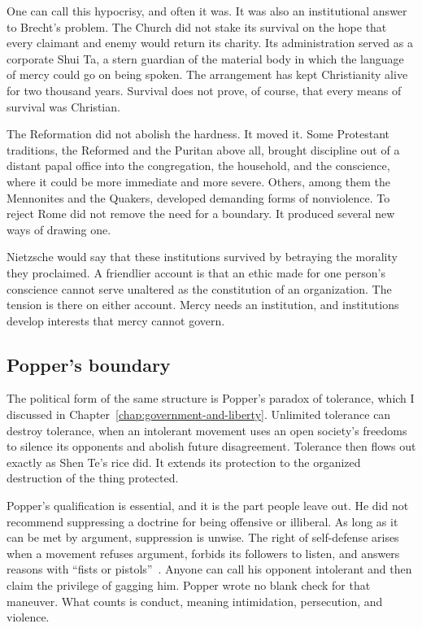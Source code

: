 \documentclass[12pt,a4paper]{book}
\begin{document}
One can call this hypocrisy, and often it was. It was also an institutional answer to Brecht's problem. The Church did not stake its survival on the hope that every claimant and enemy would return its charity. Its administration served as a corporate Shui Ta, a stern guardian of the material body in which the language of mercy could go on being spoken. The arrangement has kept Christianity alive for two thousand years. Survival does not prove, of course, that every means of survival was Christian.

The Reformation did not abolish the hardness. It moved it. Some Protestant traditions, the Reformed and the Puritan above all, brought discipline out of a distant papal office into the congregation, the household, and the conscience, where it could be more immediate and more severe. Others, among them the Mennonites and the Quakers, developed demanding forms of nonviolence. To reject Rome did not remove the need for a boundary. It produced several new ways of drawing one.

Nietzsche would say that these institutions survived by betraying the morality they proclaimed. A friendlier account is that an ethic made for one person's conscience cannot serve unaltered as the constitution of an organization. The tension is there on either account. Mercy needs an institution, and institutions develop interests that mercy cannot govern.

\subsection{Popper's boundary}

The political form of the same structure is Popper's paradox of tolerance, which I discussed in Chapter~\ref{chap:government-and-liberty}. Unlimited tolerance can destroy tolerance, when an intolerant movement uses an open society's freedoms to silence its opponents and abolish future disagreement. Tolerance then flows out exactly as Shen Te's rice did. It extends its protection to the organized destruction of the thing protected.

Popper's qualification is essential, and it is the part people leave out. He did not recommend suppressing a doctrine for being offensive or illiberal. As long as it can be met by argument, suppression is unwise. The right of self-defense arises when a movement refuses argument, forbids its followers to listen, and answers reasons with ``fists or pistols''~\cite[vol.~I, ch.~7, note~4]{Popper-TOSAIE}. Anyone can call his opponent intolerant and then claim the privilege of gagging him. Popper wrote no blank check for that maneuver. What counts is conduct, meaning intimidation, persecution, and violence.
\end{document}
